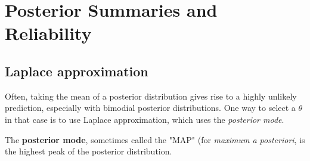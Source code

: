 \documentclass[titlepage, 12pt, leqno]{article}
\begin{document}
\pagebreak
\section{Posterior Summaries and Reliability}
\subsection{Laplace approximation}
Often, taking the mean of a posterior distribution gives rise to a highly unlikely
prediction, especially with bimodial posterior distributions. One way to select
a $\theta$ in that case is to use Laplace approximation, which uses the \textit{
posterior mode}.

\begin{definition}
    The \textbf{posterior mode}, sometimes called the "MAP" (for \textit{
    maximum a posteriori}, is the highest peak of the posterior distribution.
\end{definition}
\end{document}
